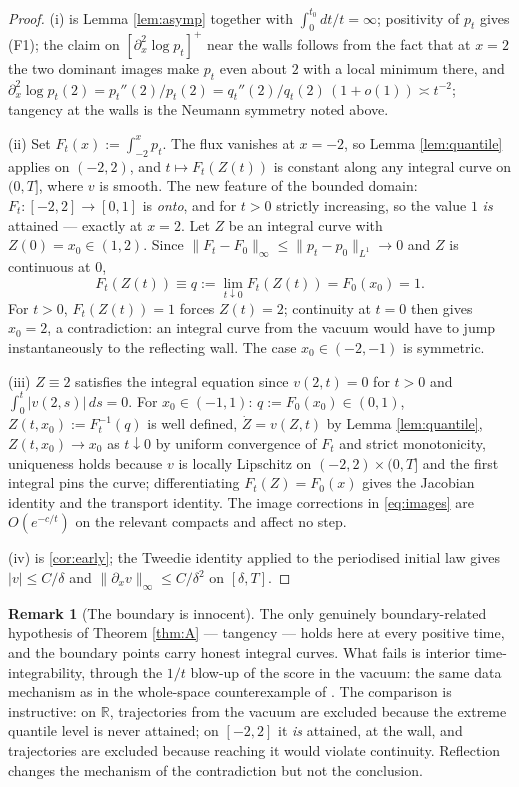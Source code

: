 \documentclass[11pt]{amsart}
\theoremstyle{definition}
\newtheorem{remark}[theorem]{Remark}
\newcommand{\R}{\mathbb{R}}
\newcommand{\dd}{\,d}
\begin{document}
\begin{proof}
(i) is Lemma \ref{lem:asymp} together with
$\int_0^{t_0}\!dt/t=\infty$; positivity of $p_t$ gives (F1); the
claim on $[\partial_x^2\log p_t]^+$ near the walls follows from the
fact that at $x=2$ the two dominant images make $p_t$ even about $2$
with a local minimum there, and $\partial_x^2\log
p_t(2)=p_t''(2)/p_t(2)=q_t''(2)/q_t(2)\,(1+o(1))\asymp t^{-2}$;
tangency at the walls is the Neumann symmetry noted above.

(ii) Set $F_t(x):=\int_{-2}^xp_t$. The flux vanishes at $x=-2$, so
Lemma \ref{lem:quantile} applies on $(-2,2)$, and $t\mapsto
F_t(Z(t))$ is constant along any integral curve on $(0,T]$, where
$v$ is smooth. The new feature of the bounded domain: $F_t:[-2,2]\to
[0,1]$ is \emph{onto}, and for $t>0$ strictly increasing, so the
value $1$ \emph{is} attained --- exactly at $x=2$. Let $Z$ be an
integral curve with $Z(0)=x_0\in(1,2)$. Since
$\|F_t-F_0\|_\infty\le\|p_t-p_0\|_{L^1}\to0$ and $Z$ is continuous
at $0$,
\[
F_t(Z(t))\equiv q:=\lim_{t\downarrow0}F_t(Z(t))=F_0(x_0)=1 .
\]
For $t>0$, $F_t(Z(t))=1$ forces $Z(t)=2$; continuity at $t=0$ then
gives $x_0=2$, a contradiction: an integral curve from the vacuum
would have to jump instantaneously to the reflecting wall. The case
$x_0\in(-2,-1)$ is symmetric.

(iii) $Z\equiv2$ satisfies the integral equation since $v(2,t)=0$
for $t>0$ and $\int_0^t|v(2,s)|\dd s=0$. For $x_0\in(-1,1)$:
$q:=F_0(x_0)\in(0,1)$, $Z(t,x_0):=F_t^{-1}(q)$ is well defined,
$\dot Z=v(Z,t)$ by Lemma \ref{lem:quantile}, $Z(t,x_0)\to x_0$ as
$t\downarrow0$ by uniform convergence of $F_t$ and strict
monotonicity, uniqueness holds because $v$ is locally Lipschitz on
$(-2,2)\times(0,T]$ and the first integral pins the curve;
differentiating $F_t(Z)=F_0(x)$ gives the Jacobian identity and the
transport identity. The image corrections in \eqref{eq:images} are
$O(e^{-c/t})$ on the relevant compacts and affect no step.

(iv) is \ref{cor:early}; the Tweedie identity applied to
the periodised initial law gives $|v|\le C/\delta$ and
$\|\partial_xv\|_\infty\le C/\delta^2$ on $[\delta,T]$.
\end{proof}

\begin{remark}[The boundary is innocent]\label{rem:innocent}
The only genuinely boundary-related hypothesis of Theorem
\ref{thm:A} --- tangency --- holds here at every positive time, and
the boundary points carry honest integral curves. What fails is
interior time-integrability, through the $1/t$ blow-up of the score
in the vacuum: the same data mechanism as in the whole-space
counterexample of \cite{pfode}. The comparison is instructive: on
$\R$, trajectories from the vacuum are excluded because the extreme
quantile level is never attained; on $[-2,2]$ it \emph{is} attained,
at the wall, and trajectories are excluded because reaching it would
violate continuity. Reflection changes the mechanism of the
contradiction but not the conclusion.
\end{remark}
\end{document}
